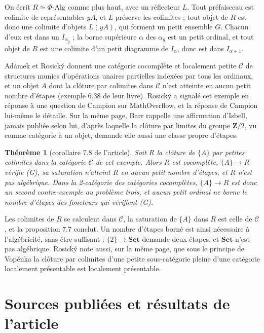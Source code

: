 \documentclass[11pt,a4paper]{amsart}
\theoremstyle{definition}
\theoremstyle{plain}
\newtheorem{theoreme}{Théorème}
\theoremstyle{remark}
\newcommand{\Set}{\mathbf{Set}}
\begin{document}
On écrit $R\simeq\Phi\text{-}\mathrm{Alg}$ comme plus haut, avec un réflecteur $L$. Tout préfaisceau est colimite de représentables $yA$, et $L$ préserve les colimites ; tout objet de $R$ est donc une colimite d'objets $L(yA)$, qui forment un petit ensemble $G$. Chacun d'eux est dans un $I_{\alpha_g}$ ; la borne supérieure $\alpha$ des $\alpha_g$ est un petit ordinal, et tout objet de $R$ est une colimite d'un petit diagramme de $I_\alpha$, donc est dans $I_{\alpha+1}$.

Adámek et Rosický donnent une catégorie cocomplète et localement petite $\mathcal C$ de structures munies d'opérations unaires partielles indexées par tous les ordinaux, et un objet $A$ dont la clôture par colimites dans $\mathcal C$ n'est atteinte en aucun petit nombre d'étapes (exemple 6.38 de leur livre). Rosický a signalé cet exemple en réponse à une question de Campion sur MathOverflow, et la réponse de Campion lui-même le détaille. Sur la même page, Barr rappelle une affirmation d'Isbell, jamais publiée selon lui, d'après laquelle la clôture par limites du groupe $\mathbf Z/2$, vu comme catégorie à un objet, demande elle aussi une classe propre d'étapes.

\begin{theoreme}[corollaire 7.8 de l'article]
Soit $R$ la clôture de $\{A\}$ par petites colimites dans la catégorie $\mathcal C$ de cet exemple. Alors $R$ est cocomplète, $\{A\}\to R$ vérifie (G), sa saturation n'atteint $R$ en aucun petit nombre d'étapes, et $R$ n'est pas algébrique. Dans la 2-catégorie des catégories cocomplètes, $\{A\}\to R$ est donc un second contre-exemple au problème trois, et aucun petit ordinal ne borne le nombre d'étapes des foncteurs qui vérifient (G).
\end{theoreme}

Les colimites de $R$ se calculent dans $\mathcal C$, la saturation de $\{A\}$ dans $R$ est celle de $\mathcal C$, et la proposition 7.7 conclut. Un nombre d'étapes borné est ainsi nécessaire à l'algébricité, sans être suffisant : $\{2\}\to\Set$ demande deux étapes, et $\Set$ n'est pas algébrique. Rosický note aussi, sur la même page, que sous le principe de Vop\v{e}nka la clôture par colimites d'une petite sous-catégorie pleine d'une catégorie localement présentable est localement présentable.

\section{Sources publiées et résultats de l'article}
\end{document}
